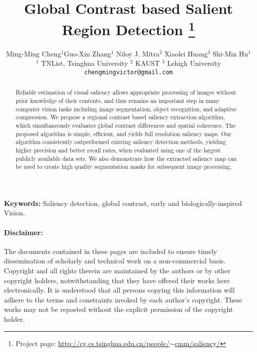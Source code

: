 \documentclass[a4paper,14pt]{article}
\begin{document}
\title{Global Contrast based Salient Region Detection 
    \footnote{Project page:
    \href{http://cg.cs.tsinghua.edu.cn/people/\~cmm/saliency/}
    {http://cg.cs.tsinghua.edu.cn/people/$\sim$cmm/saliency/}} 
}

\author{\small Ming-Ming Cheng$^{1}$\quad Guo-Xin Zhang$^{1}$ \quad Niloy J. Mitra$^{2}$
    \quad Xiaolei Huang$^{3}$  \quad Shi-Min Hu$^{1}$  \\
    $^{1}$ TNList, Tsinghua University \quad \quad
    $^2$ KAUST   \quad \quad $^3$ Lehigh University\\
    {\tt \small chengmingvictor@gmail.com}
}

\date{}
\maketitle

\begin{abstract}
Reliable estimation of visual saliency allows appropriate processing of images without prior
knowledge of their contents, and thus remains an important step in many computer vision tasks
including image segmentation, object recognition, and adaptive compression.
We propose a regional contrast based saliency extraction algorithm,
which simultaneously evaluates global contrast differences and spatial coherence.
The proposed algorithm is simple, efficient, and yields full resolution saliency maps.
Our algorithm consistently outperformed existing saliency detection methods, yielding
higher precision and better recall rates, when evaluated using one of the largest
publicly available data sets.
We also demonstrate how the extracted saliency map can be used to create high quality
segmentation masks for subsequent image processing.
\end{abstract}


\textbf{Keywords:}\quad
Saliency detection, global contrast, early and biologically-inspired Vision.



\vspace{.1in}

\paragraph{Disclaimer: }
The documents contained in these pages are included to ensure timely
dissemination of scholarly and technical work on a non-commercial basis.
Copyright and all rights therein are maintained by the authors or by other
copyright holders, notwithstanding that they have offered their works here
electronically. It is understood that all persons copying this information
will adhere to the terms and constraints invoked by each author's copyright.
These works may not be reposted without the explicit permission of the
copyright holder.
\end{document}
